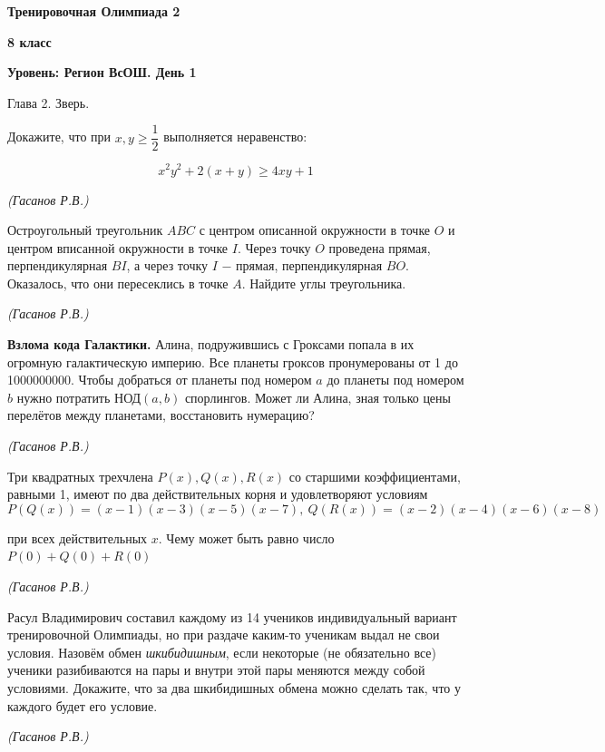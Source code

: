 \centerline{\Huge \bf  Тренировочная Олимпиада 2}
\centerline{\Huge \bf 8 класс}
\centerline{\Huge \bf Уровень: Регион ВсОШ. День 1}

\begin{flushright}
    \scriptsize{Глава 2. Зверь.}
\end{flushright}


 Докажите, что при $x, y \geq \dfrac{1}{2}$ выполняется неравенство:
 
\[ x^2y^2 + 2(x+y) \geq 4xy + 1 \]
\begin{flushright}
    \textit{\small{(Гасанов Р.В.)}}
\end{flushright}


Остроугольный треугольник $ABC$ с центром описанной окружности в точке $O$ и центром вписанной окружности в точке $I$. Через точку $O$ проведена прямая, перпендикулярная $BI$, а через точку $I$ $-$ прямая, перпендикулярная $BO$. Оказалось, что они пересеклись в точке $A$. Найдите углы треугольника.
\begin{flushright}
    \textit{\small{(Гасанов Р.В.)}}
\end{flushright}


\textbf{Взлома кода Галактики.} Алина, подружившись с Гроксами попала в их огромную галактическую империю. Все планеты гроксов пронумерованы от 1 до 1000000000. Чтобы добраться от планеты под номером $a$ до планеты под номером $b$ нужно потратить НОД$(a, b)$ спорлингов. Может ли Алина, зная только цены перелётов между планетами, восстановить нумерацию?
\begin{flushright}
    \textit{\small{(Гасанов Р.В.)}}
\end{flushright}

Три квадратных трехчлена $P(x), Q(x), R(x)$ со старшими коэффициентами, равными 1, имеют по два действительных корня и удовлетворяют условиям 
\[P(Q(x)) = (x-1)(x-3)(x-5)(x-7), \ Q(R(x)) = (x-2)(x-4)(x-6)(x-8) \]

при всех действительных $x$. Чему может быть равно число $P(0)+Q(0)+R(0) $
\begin{flushright}
    \textit{\small{(Гасанов Р.В.)}}
\end{flushright}

Расул Владимирович составил каждому из 14 учеников индивидуальный вариант тренировочной Олимпиады, но при раздаче каким-то ученикам выдал не свои условия. Назовём обмен \textit{шкибидишным}, если некоторые (не обязательно все) ученики разибиваются на пары и внутри этой пары меняются между собой условиями. Докажите, что за два шкибидишных обмена можно сделать так, что у каждого будет его условие.
\begin{flushright}
    \textit{\small{(Гасанов Р.В.)}}
\end{flushright}